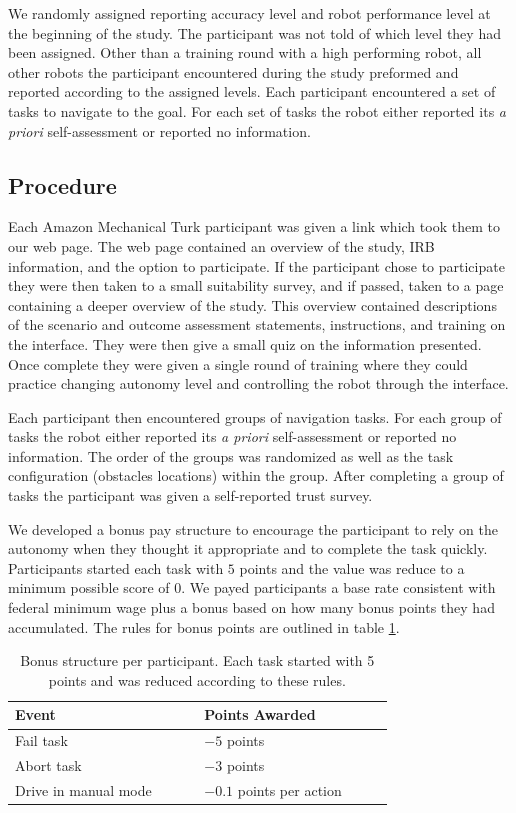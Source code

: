 \documentclass[aaai]{article}
\begin{document}
We randomly assigned reporting accuracy level and robot performance level at the beginning of the study. The participant was not told of which level they had been assigned. Other than a training round with a high performing robot, all other robots the participant encountered during the study preformed and reported according to the assigned levels. Each participant encountered a set of tasks to navigate to the goal. For each set of tasks the robot either reported its \textit{a priori} self-assessment or reported no information. 

\subsection{Procedure}
Each Amazon Mechanical Turk participant was given a link which took them to our web page. The web page contained an overview of the study, IRB information, and the option to participate. If the participant chose to participate they were then taken to a small suitability survey, and if passed, taken to a page containing a deeper overview of the study. This overview contained descriptions of the scenario and outcome assessment statements, instructions, and training on the interface. They were then give a small quiz on the information presented. Once complete they were given a single round of training where they could practice changing autonomy level and controlling the robot through the interface.

Each participant then encountered groups of navigation tasks. For each group of tasks the robot either reported its \textit{a priori} self-assessment or reported no information. The order of the groups was randomized as well as the task configuration (obstacles locations) within the group. After completing a group of tasks the participant was given a self-reported trust survey.

We developed a bonus pay structure to encourage the participant to rely on the autonomy when they thought it appropriate and to complete the task quickly. Participants started each task with $5$ points and the value was reduce to a minimum possible score of $0$. We payed participants a base rate consistent with federal minimum wage plus a bonus based on how many bonus points they had accumulated. The rules for bonus points are outlined in table \ref{BONUS}.

\begin{table}[h]
    \begin{center}
    \begin{tabular}{|p{0.4\linewidth} || p{0.4\linewidth}|}
    \hline
    \textbf{Event} & \textbf{Points Awarded} \\
    \hline
    \hline
    Fail task & $-5$ points\\
    \hline
    Abort task & $-3$ points \\
    \hline
    Drive in manual mode & $-0.1$ points per action \\
    \hline
    \end{tabular}
    \end{center}
    \caption{Bonus structure per participant. Each task started with 5 points and was reduced according to these rules.}
    \label{BONUS}
\end{table}
\end{document}
